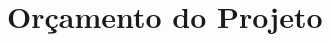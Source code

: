\chapter[Orçamento do Projeto]{Orçamento do Projeto}

\begin{figure}[H]
	\centering
	\caption{}
\end{figure}

\begin{figure}[H]
	\centering
	\caption{}
\end{figure}

\begin{figure}[H]
	\centering
	\caption{}
\end{figure}

